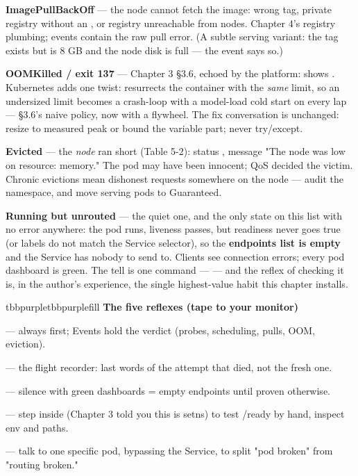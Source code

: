 \begin{tbbitemize}
  \item \textbf{ImagePullBackOff} — the node cannot fetch the image: wrong tag, private registry without an , or registry unreachable from nodes. Chapter 4's registry plumbing;  events contain the raw pull error. (A subtle serving variant: the tag exists but is 8 GB and the node disk is full — the event says so.)
  \item \textbf{OOMKilled / exit 137} — Chapter 3 §3.6, echoed by the platform:  shows . Kubernetes adds one twist:  resurrects the container with the \textit{same} limit, so an undersized limit becomes a crash-loop with a model-load cold start on every lap — §3.6's naive policy, now with a flywheel. The fix conversation is unchanged: resize to measured peak or bound the variable part; never try/except.
  \item \textbf{Evicted} — the \textit{node} ran short (Table 5-2): status , message "The node was low on resource: memory." The pod may have been innocent; QoS decided the victim. Chronic evictions mean dishonest requests somewhere on the node — audit the namespace, and move serving pods to Guaranteed.
  \item \textbf{Running but unrouted} — the quiet one, and the only state on this list with no error anywhere: the pod runs, liveness passes, but readiness never goes true (or labels do not match the Service selector), so the \textbf{endpoints list is empty} and the Service has nobody to send to. Clients see connection errors; every pod dashboard is green. The tell is one command —  — and the reflex of checking it is, in the author's experience, the single highest-value habit this chapter installs.
\end{tbbitemize}

\begin{calloutbox}{tbbpurple}{tbbpurplefill}
{\normalsize\bfseries\color{tbbpurple}The five reflexes (tape to your monitor)}\par\vspace{3pt}
\begin{tbbitemize}
  \item {} — always first; Events hold the verdict (probes, scheduling, pulls, OOM, eviction).
  \item {} — the flight recorder: last words of the attempt that died, not the fresh one.
  \item {} — silence with green dashboards = empty endpoints until proven otherwise.
  \item {} — step inside (Chapter 3 told you this is setns) to test /ready by hand, inspect env and paths.
  \item {} — talk to one specific pod, bypassing the Service, to split "pod broken" from "routing broken."
\end{tbbitemize}
\end{calloutbox}

